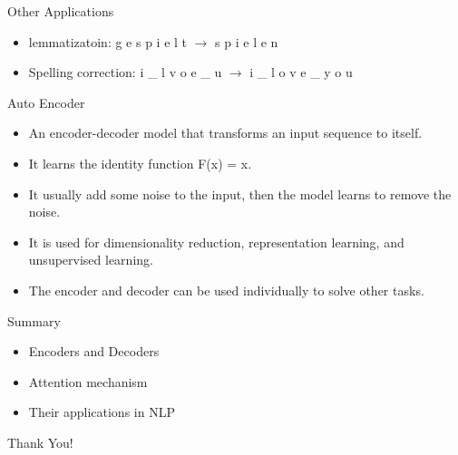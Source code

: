 \begin{frame}{Other Applications}
\begin{itemize}
    \item lemmatizatoin: g e s p i e l t $\longrightarrow$  s p i e l e n 
    \item Spelling correction: i \_ l v o e \_ u  $\longrightarrow$ i \_ l o v e \_ y o u
\end{itemize}    
\end{frame}

\begin{frame}{Auto Encoder}
\begin{itemize}
    \item An encoder-decoder model that transforms an input sequence to itself.
    \item It learns the identity function F(x) = x.
    \item It usually add some noise to the input, then the model learns to remove the noise.
    \item It is used for dimensionality reduction, representation learning, and unsupervised learning.
    \item The encoder and decoder can be used individually to solve other tasks.
\end{itemize}
    
\end{frame}

\begin{frame}{Summary}
    \begin{itemize}
        \item Encoders and Decoders
        \item Attention mechanism
        \item Their applications in NLP
    \end{itemize}
\end{frame}
\begin{frame}[c]
\begin{center}
\LARGE{Thank You!}
\end{center}
\end{frame}

